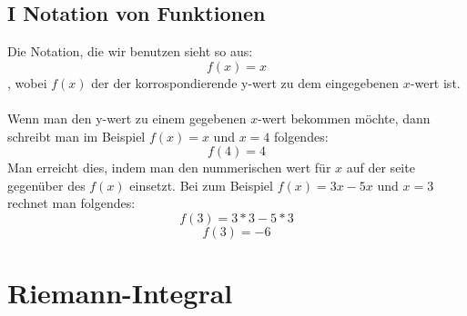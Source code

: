 \documentclass[fontsize=12pt,paper=a4,DIV12,cleardoublepage=empty, 
liststotoc,idxtotoc,bibtotoc]{article}
\theoremstyle{plain}
\theoremstyle{definition}
\begin{document}
		\subsection{I Notation von Funktionen}
			Die Notation, die wir benutzen sieht so aus:
			\begin{equation*}
				f(x) = x
			\end{equation*}
			, wobei $f(x)$ der der korrospondierende y-wert zu dem eingegebenen $x$-wert ist.\\ \\
			Wenn man den y-wert zu einem gegebenen $x$-wert bekommen möchte, dann schreibt man im Beispiel $f(x)=x$ und $x=4$ folgendes:
			\begin{equation}
				f(4) = 4
			\end{equation}
			Man erreicht dies, indem man den nummerischen wert für $x$ auf der seite gegenüber des $f(x)$ einsetzt. Bei zum Beispiel $f(x)=3x-5x$ und $x=3$ rechnet man folgendes:
			\begin{equation*}
				f(3)=3*3-5*3
			\end{equation*}
			\begin{equation*}
				f(3)=-6
			\end{equation*}
			
	
	
	\section{Riemann-Integral}	
\end{document}
